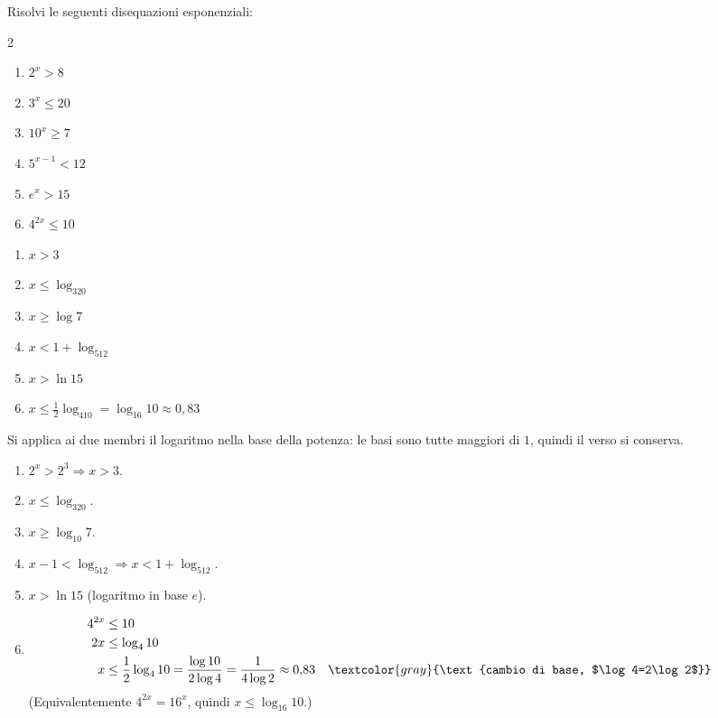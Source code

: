 
\begin{question}[ID=3.5, subtitle={Disequazioni esponenziali risolte con i logaritmi}, difficulty=media, tags={disequazioni esponenziali, logaritmi}]
Risolvi le seguenti disequazioni esponenziali:
\begin{center}\begin{minipage}{0.92\linewidth}
\begin{multicols}{2}
\begin{enumerate}[leftmargin=3.2cm]
\item $2^x > 8$
\item $3^x \le 20$
\item $10^x \ge 7$
\item $5^{x-1} < 12$
\item $e^x > 15$
\item $4^{2x} \le 10$
\end{enumerate}
\end{multicols}
\end{minipage}\end{center}
\begin{solution}
\begin{enumerate}
    \item $x>3$
    \item $x\leq\log_320$
    \item $x\geq\log7$
    \item $x<1+\log_512$
    \item $x>\ln15$
    \item $x\leq\tfrac12\log_410=\log_{16}10\approx0{,}83$
\end{enumerate}
\end{solution}
\begin{explanation}
Si applica ai due membri il logaritmo nella base della potenza: le basi sono tutte maggiori di $1$, quindi il verso si conserva.
\begin{enumerate}
    \item $2^x>2^3 \Rightarrow x>3$.
    \item $x\leq\log_320$.
    \item $x\geq\log_{10}7$.
    \item $x-1<\log_512 \Rightarrow x<1+\log_512$.
    \item $x>\ln15$ (logaritmo in base $e$).
    \item \[\begin{aligned}
    4^{2x} &\leq 10\\
    2x &\leq \log_410\\
    x &\leq \dfrac12\log_410=\dfrac{\log10}{2\log4}=\dfrac{1}{4\log2}\approx0{,}83 && \textcolor{gray}{\text{cambio di base, $\log4=2\log2$}}
    \end{aligned}\]
    (Equivalentemente $4^{2x}=16^x$, quindi $x\leq\log_{16}10$.)
\end{enumerate}
\end{explanation}
\end{question}
